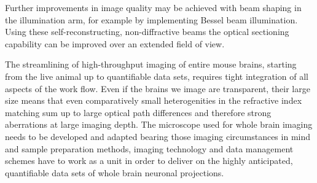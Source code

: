 \documentclass[12pt]{spieman}  %
\begin{document}
Further improvements in image quality may be achieved with beam shaping in the illumination arm, for example by implementing Bessel beam illumination\cite{Fahrbach2010,Planchon2011,Gao2014}. Using these self-reconstructing, non-diffractive beams the optical sectioning capability can be improved over an extended field of view. 

The streamlining of high-throughput imaging of entire mouse brains, starting from the live animal up to quantifiable data sets, requires tight integration of all aspects of the work flow. Even if the brains we image are transparent, their large size means that even comparatively small heterogenities in the refractive index matching sum up to large optical path differences and therefore strong aberrations at large imaging depth. The microscope used for whole brain imaging needs to be developed and adapted bearing those imaging circumstances in mind and sample preparation methods, imaging technology and data management schemes have to work as a unit in order to deliver on the highly anticipated, quantifiable data sets of whole brain neuronal projections.
\end{document}
